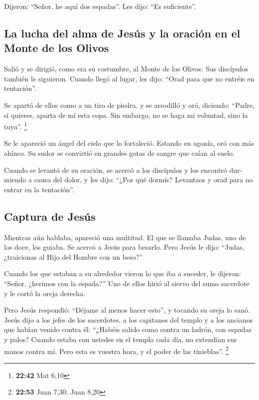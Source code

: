 \begin{paracol}{2}
\begin{otherlanguage}{english}
 Dijeron: ``Señor, he aquí dos espadas''. Les dijo: ``Es
suficiente''.

\hypertarget{la-lucha-del-alma-de-jesuxfas-y-la-oraciuxf3n-en-el-monte-de-los-olivos}{%
\subsection{La lucha del alma de Jesús y la oración en el Monte de los
Olivos}\label{la-lucha-del-alma-de-jesuxfas-y-la-oraciuxf3n-en-el-monte-de-los-olivos}}

 Salió y se dirigió, como era su costumbre, al Monte de
los Olivos. Sus discípulos también le siguieron.  Cuando
llegó al lugar, les dijo: ``Orad para que no entréis en tentación''.

 Se apartó de ellos como a un tiro de piedra, y se
arrodilló y oró,  diciendo: ``Padre, si quieres, aparta
de mí esta copa. Sin embargo, no se haga mi voluntad, sino la tuya''.
\footnote{\textbf{22:42} Mat 6,10}

 Se le apareció un ángel del cielo que lo fortaleció.
 Estando en agonía, oró con más ahínco. Su sudor se
convirtió en grandes gotas de sangre que caían al suelo.

 Cuando se levantó de su oración, se acercó a los
discípulos y los encontró durmiendo a causa del dolor,  y
les dijo: ``¿Por qué dormís? Levantaos y orad para no entrar en la
tentación''.

\hypertarget{captura-de-jesuxfas}{%
\subsection{Captura de Jesús}\label{captura-de-jesuxfas}}

 Mientras aún hablaba, apareció una multitud. El que se
llamaba Judas, uno de los doce, los guiaba. Se acercó a Jesús para
besarlo.  Pero Jesús le dijo: ``Judas, ¿traicionas al
Hijo del Hombre con un beso?''

 Cuando los que estaban a su alrededor vieron lo que iba
a suceder, le dijeron: ``Señor, ¿herimos con la espada?''
 Uno de ellos hirió al siervo del sumo sacerdote y le
cortó la oreja derecha.

 Pero Jesús respondió: ``Déjame al menos hacer esto'', y
tocando su oreja lo sanó.  Jesús dijo a los jefes de los
sacerdotes, a los capitanes del templo y a los ancianos que habían
venido contra él: ``¿Habéis salido como contra un ladrón, con espadas y
palos?  Cuando estaba con ustedes en el templo cada día,
no extendían sus manos contra mí. Pero esta es vuestra hora, y el poder
de las tinieblas''. \footnote{\textbf{22:53} Juan 7,30; Juan 8,20}


\end{otherlanguage}
\end{paracol}
